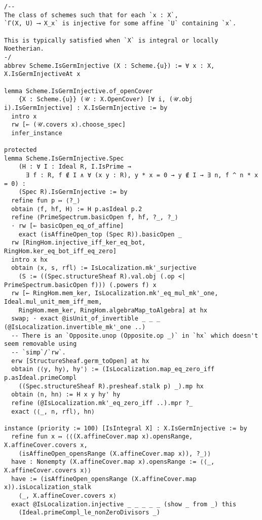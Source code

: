 \documentclass{article}
\begin{document}
\begin{lstlisting}[language=Lean, caption={SpreadingOut.lean}]
/--
The class of schemes such that for each `x : X`,
`Γ(X, U) ⟶ X_x` is injective for some affine `U` containing `x`.

This is typically satisfied when `X` is integral or locally Noetherian.
-/
abbrev Scheme.IsGermInjective (X : Scheme.{u}) := ∀ x : X, X.IsGermInjectiveAt x

lemma Scheme.IsGermInjective.of_openCover
    {X : Scheme.{u}} (𝒰 : X.OpenCover) [∀ i, (𝒰.obj i).IsGermInjective] : X.IsGermInjective := by
  intro x
  rw [← (𝒰.covers x).choose_spec]
  infer_instance

protected
lemma Scheme.IsGermInjective.Spec
    (H : ∀ I : Ideal R, I.IsPrime →
      ∃ f : R, f ∉ I ∧ ∀ (x y : R), y * x = 0 → y ∉ I → ∃ n, f ^ n * x = 0) :
    (Spec R).IsGermInjective := by
  refine fun p ↦ ⟨?_⟩
  obtain ⟨f, hf, H⟩ := H p.asIdeal p.2
  refine ⟨PrimeSpectrum.basicOpen f, hf, ?_, ?_⟩
  · rw [← basicOpen_eq_of_affine]
    exact (isAffineOpen_top (Spec R)).basicOpen _
  rw [RingHom.injective_iff_ker_eq_bot, RingHom.ker_eq_bot_iff_eq_zero]
  intro x hx
  obtain ⟨x, s, rfl⟩ := IsLocalization.mk'_surjective
    (S := ((Spec.structureSheaf R).val.obj (.op <| PrimeSpectrum.basicOpen f))) (.powers f) x
  rw [← RingHom.mem_ker, IsLocalization.mk'_eq_mul_mk'_one, Ideal.mul_unit_mem_iff_mem,
    RingHom.mem_ker, RingHom.algebraMap_toAlgebra] at hx
  swap; · exact @isUnit_of_invertible _ _ _ (@IsLocalization.invertible_mk'_one ..)
  -- There is an `Opposite.unop (Opposite.op _)` in `hx` which doesn't seem removable using
  -- `simp`/`rw`.
  erw [StructureSheaf.germ_toOpen] at hx
  obtain ⟨⟨y, hy⟩, hy'⟩ := (IsLocalization.map_eq_zero_iff p.asIdeal.primeCompl
    ((Spec.structureSheaf R).presheaf.stalk p) _).mp hx
  obtain ⟨n, hn⟩ := H x y hy' hy
  refine (@IsLocalization.mk'_eq_zero_iff ..).mpr ?_
  exact ⟨⟨_, n, rfl⟩, hn⟩

instance (priority := 100) [IsIntegral X] : X.IsGermInjective := by
  refine fun x ↦ ⟨⟨(X.affineCover.map x).opensRange, X.affineCover.covers x,
    (isAffineOpen_opensRange (X.affineCover.map x)), ?_⟩⟩
  have : Nonempty (X.affineCover.map x).opensRange := ⟨⟨_, X.affineCover.covers x⟩⟩
  have := (isAffineOpen_opensRange (X.affineCover.map x)).isLocalization_stalk
    ⟨_, X.affineCover.covers x⟩
  exact @IsLocalization.injective _ _ _ _ _ (show _ from _) this
    (Ideal.primeCompl_le_nonZeroDivisors _)


\end{lstlisting}
\end{document}
